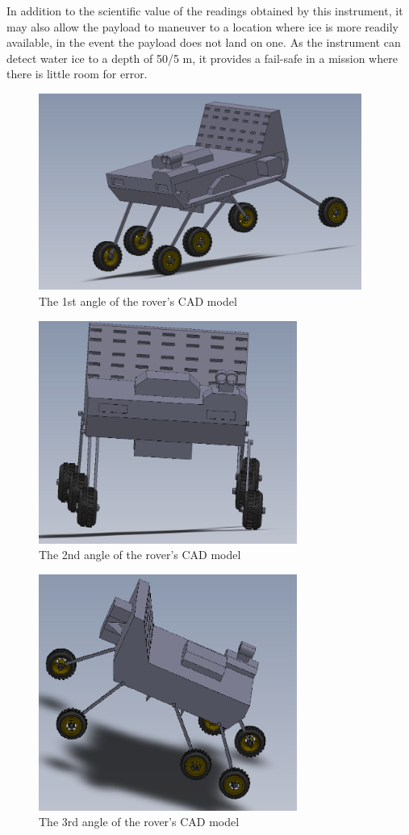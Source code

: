 \documentclass[%
 portrait,
 aapm,
 mph,%
 amsmath,amssymb,
 reprint,%
]{revtex4-2}
\begin{document}
 In addition to the scientific value of the readings obtained by this instrument, it may also allow the payload to maneuver to a location where ice is more readily available, in the event the payload does not land on one. As the instrument can detect water ice to a depth of 50/5 m, it provides a fail-safe in a mission where there is little room for error.
\begin{figure}
  \includegraphics[width=300pt]{Instruments/roverAngle1.png}
   \caption{The 1st angle of the rover's CAD model}
\end{figure} 
\begin{figure}
  \includegraphics[width=240pt]{Instruments/roverAngle2.png}
   \caption{The 2nd angle of the rover's CAD model}
\end{figure} 
\begin{figure}
  \includegraphics[width=240pt]{Instruments/roverAngle3.png}
   \caption{The 3rd angle of the rover's CAD model}
\end{figure} 
\end{document}
